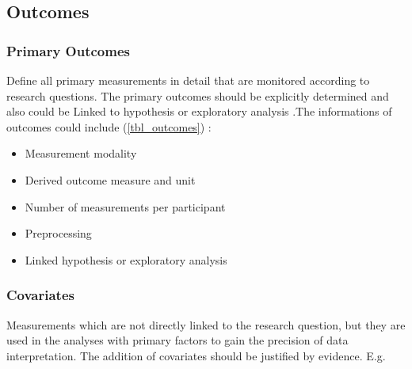 \subsection{Outcomes}

\subsubsection{Primary Outcomes}
\begin{prereg}
\begin{instruction}
Define all primary measurements in detail that are monitored according to research questions. The primary outcomes should be explicitly determined and also could be Linked to hypothesis or exploratory analysis .The informations of outcomes could include (\cref{tbl_outcomes}) :
\begin{itemize}
    \item Measurement modality
    \item Derived outcome measure and unit
    \item Number of measurements per participant
    \item Preprocessing
    \item Linked hypothesis or exploratory analysis
\end{itemize}
\end{instruction}
\end{prereg}




\subsubsection{Covariates}
\begin{prereg}
\begin{instruction}
Measurements which are not directly linked to the research question, but they are used in the analyses with primary factors to gain the precision of data interpretation. The addition of covariates should be justified by evidence. E.g. 
\end{instruction}
\end{prereg}


